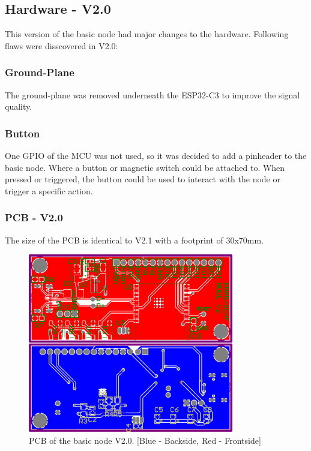 \subsection{Hardware - V2.0}

    This version of the basic node had major changes to the hardware. Following flaws
    were disscovered in V2.0:

    \subsubsection{Ground-Plane}
        The ground-plane was removed underneath the ESP32-C3 to improve the
        signal quality. 

    \subsubsection{Button}
        One GPIO of the MCU was not used, so it was decided to add a pinheader to the basic node.
        Where a button or magnetic switch could be attached to. When pressed or triggered, the
        button could be used to interact with the node or trigger a specific action.

    \subsubsection{PCB - V2.0}
        The size of the PCB is identical to V2.1 with a footprint of 30x70mm.
        
    \begin{figure}[H]
        \centering
        \includegraphics[width=0.8\textwidth]{assets/HW/PCB-NODE-V2.0.png}
        \caption{PCB of the basic node V2.0. [Blue - Backside, Red - Frontside]}
    \end{figure}
